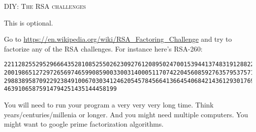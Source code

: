 \textsc{DIY: The RSA challenges}

This is optional.

Go to \url{https://en.wikipedia.org/wiki/RSA_Factoring_Challenge}
and try to factorize any of the RSA challenges.
For instance here's RSA-260:
\begin{Verbatim}[fontsize=\footnotesize,frame=single]
2211282552952966643528108525502623092761208950247001539441374831912882294140
2001986512729726569746599085900330031400051170742204560859276357953757185954
2988389587092292384910067030341246205457845664136645406842143612930176940208
46391065875914794251435144458199
\end{Verbatim}
You will need to run your program a very very very long time.
Think years/centuries/millenia or longer.
And you might need multiple computers.
You might want to google prime factorization algorithms.


